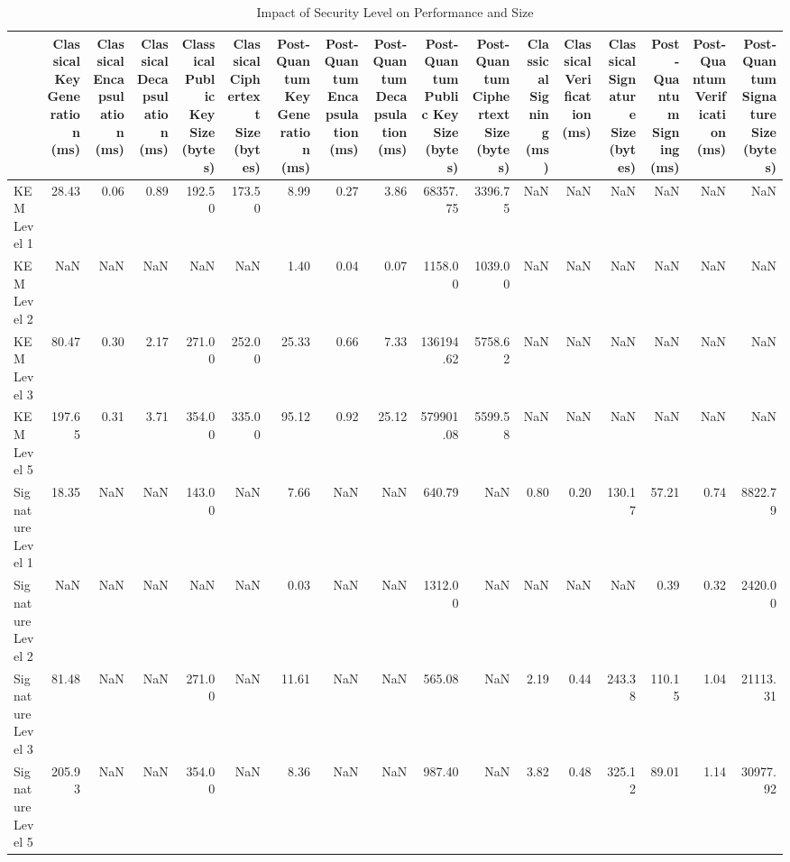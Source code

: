 \begin{table}
\caption{Impact of Security Level on Performance and Size}
\label{tab:security_impact}
\begin{tabular}{lrrrrrrrrrrrrrrrr}
\toprule
 & Classical Key Generation (ms) & Classical Encapsulation (ms) & Classical Decapsulation (ms) & Classical Public Key Size (bytes) & Classical Ciphertext Size (bytes) & Post-Quantum Key Generation (ms) & Post-Quantum Encapsulation (ms) & Post-Quantum Decapsulation (ms) & Post-Quantum Public Key Size (bytes) & Post-Quantum Ciphertext Size (bytes) & Classical Signing (ms) & Classical Verification (ms) & Classical Signature Size (bytes) & Post-Quantum Signing (ms) & Post-Quantum Verification (ms) & Post-Quantum Signature Size (bytes) \\
\midrule
KEM Level 1 & 28.43 & 0.06 & 0.89 & 192.50 & 173.50 & 8.99 & 0.27 & 3.86 & 68357.75 & 3396.75 & NaN & NaN & NaN & NaN & NaN & NaN \\
KEM Level 2 & NaN & NaN & NaN & NaN & NaN & 1.40 & 0.04 & 0.07 & 1158.00 & 1039.00 & NaN & NaN & NaN & NaN & NaN & NaN \\
KEM Level 3 & 80.47 & 0.30 & 2.17 & 271.00 & 252.00 & 25.33 & 0.66 & 7.33 & 136194.62 & 5758.62 & NaN & NaN & NaN & NaN & NaN & NaN \\
KEM Level 5 & 197.65 & 0.31 & 3.71 & 354.00 & 335.00 & 95.12 & 0.92 & 25.12 & 579901.08 & 5599.58 & NaN & NaN & NaN & NaN & NaN & NaN \\
Signature Level 1 & 18.35 & NaN & NaN & 143.00 & NaN & 7.66 & NaN & NaN & 640.79 & NaN & 0.80 & 0.20 & 130.17 & 57.21 & 0.74 & 8822.79 \\
Signature Level 2 & NaN & NaN & NaN & NaN & NaN & 0.03 & NaN & NaN & 1312.00 & NaN & NaN & NaN & NaN & 0.39 & 0.32 & 2420.00 \\
Signature Level 3 & 81.48 & NaN & NaN & 271.00 & NaN & 11.61 & NaN & NaN & 565.08 & NaN & 2.19 & 0.44 & 243.38 & 110.15 & 1.04 & 21113.31 \\
Signature Level 5 & 205.93 & NaN & NaN & 354.00 & NaN & 8.36 & NaN & NaN & 987.40 & NaN & 3.82 & 0.48 & 325.12 & 89.01 & 1.14 & 30977.92 \\
\bottomrule
\end{tabular}
\end{table}
